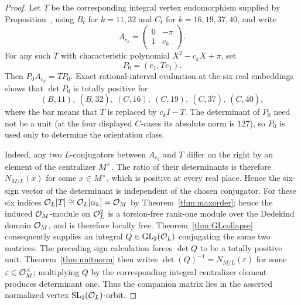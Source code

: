 \begin{proof}
Let $T$ be the corresponding integral vertex endomorphism supplied by
Proposition~, using $B_t$ for $k=11,32$ and $C_t$ for
$k=16,19,37,40$, and write
\[
 A_{c_k}=\begin{pmatrix}0&-\pi\\1&c_k\end{pmatrix}.
\]
For any such $T$ with characteristic polynomial $X^2-c_kX+\pi$, set
\[
 P_0=(e_1,Te_1).
\]
Then $P_0A_{c_k}=TP_0$.  Exact rational-interval evaluation at the six real
embeddings shows that $\det P_0$ is totally positive for
\[
 (B,11),\ (B,\overline{32}),\ (C,16),\ (C,19),\
 (C,\overline{37}),\ (C,\overline{40}),
\]
where the bar means that $T$ is replaced by $c_kI-T$.  The determinant of $P_0$
need not be a unit (at the four displayed $C$-cases its absolute norm is $127$),
so $P_0$ is used only to determine the orientation class.

Indeed, any two $L$-conjugators between $A_{c_k}$ and $T$ differ on the right by
an element of the centralizer $M^\times$.  The ratio of their determinants is
therefore $N_{M/L}(x)$ for some $x\in M^\times$, which is positive at every real
place.  Hence the six-sign vector of the determinant is independent of the chosen
conjugator.  For these six indices $\mathcal O_L[T]\cong\mathcal O_L[\alpha_k]=\mathcal O_M$ by
Theorem~\ref{thm:maxorder}; hence the induced $\mathcal O_M$-module on $\mathcal O_L^2$ is a
torsion-free rank-one module over the Dedekind domain $\mathcal O_M$, and is therefore locally free.
Theorem~\ref{thm:GLcollapse} consequently supplies an integral
$Q\in\mathrm{GL}_2(\mathcal O_L)$ conjugating the same two matrices.
The preceding sign calculation forces $\det Q$ to be a totally positive unit.
Theorem~\ref{thm:unitnorm} then writes $\det(Q)^{-1}=N_{M/L}(\varepsilon)$ for
some $\varepsilon\in\mathcal O_M^\times$; multiplying $Q$ by the corresponding integral
centralizer element produces determinant one.  Thus the companion matrix lies in
the asserted normalized vertex $\mathrm{SL}_2(\mathcal O_L)$-orbit.
\end{proof}


